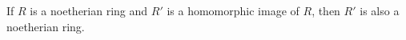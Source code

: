 If $R$ is a noetherian ring and $R'$ is a homomorphic image of $R$, then $R'$ is also a noetherian ring.
